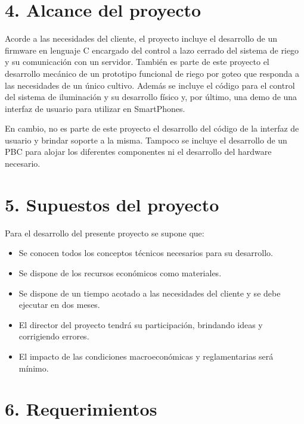 \documentclass[
11pt, %
]{charter}
\begin{document}
\section{4. Alcance del proyecto}
\label{sec:alcance}

Acorde a las necesidades del cliente, el proyecto incluye el desarrollo de un firmware en lenguaje C encargado del control a lazo cerrado del sistema de riego y su comunicación con un servidor. También es parte de este proyecto el desarrollo mecánico de un prototipo funcional de riego por goteo que responda a las necesidades de un único cultivo. Además se incluye el código para el control del sistema de iluminación y su desarrollo físico y, por último, una demo de una interfaz de usuario para utilizar en SmartPhones.

En cambio, no es parte de este proyecto el desarrollo del código de la interfaz de usuario y brindar soporte a la misma. Tampoco se incluye el desarrollo de un PBC para alojar los diferentes componentes ni el desarrollo del hardware necesario.


\section{5. Supuestos del proyecto}
\label{sec:supuestos}

Para el desarrollo del presente proyecto se supone que:

\begin{itemize}
	\item Se conocen todos los conceptos técnicos necesarios para su desarrollo. 
	\item Se dispone de los recursos económicos como materiales.
	\item Se dispone de un tiempo acotado a las necesidades del cliente y se debe ejecutar en dos meses.
	\item El director del proyecto tendrá su participación, brindando ideas y corrigiendo errores.
	\item El impacto de las condiciones macroeconómicas y reglamentarias será mínimo.
\end{itemize}

\section{6. Requerimientos}
\label{sec:requerimientos}
\end{document}
